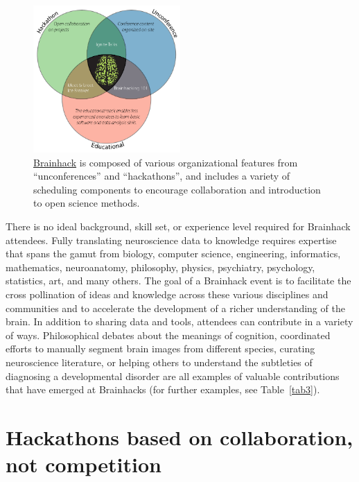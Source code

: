 \documentclass[11pt]{bmc_article_s50}
\begin{document}
\begin{figure}[htp]
\begin{center}
  \includegraphics[width=0.5\textwidth]{Figure_01}
  \caption{\href{http://www.brainhack.org}{Brainhack} is composed of various organizational features from ``unconferences'' and ``hackathons'', and includes a variety of scheduling components to encourage collaboration and introduction to open science methods.}
  \label{fig1}
\end{center}
\end{figure}

There is no ideal background, skill set, or experience level required for Brainhack attendees. Fully translating neuroscience data to knowledge requires expertise that spans the gamut from biology, computer science, engineering, informatics, mathematics, neuroanatomy, philosophy, physics, psychiatry, psychology, statistics, art, and many others. The goal of a Brainhack event is to facilitate the cross pollination of ideas and knowledge across these various disciplines and communities and to accelerate the development of a richer understanding of the brain. In addition to sharing data and tools, attendees can contribute in a variety of ways. Philosophical debates about the meanings of cognition, coordinated efforts to manually segment brain images from different species, curating neuroscience literature, or helping others to understand the subtleties of diagnosing a developmental disorder are all examples of valuable contributions that have emerged at Brainhacks (for further examples, see Table~\ref{tab3}).

\section{Hackathons based on collaboration, not competition}
\end{document}
